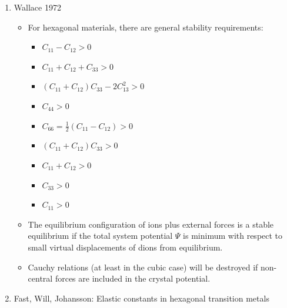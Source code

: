 \documentclass[11pt]{article}
\begin{document}
\begin{enumerate}
\item Wallace 1972
\label{sec:org4622896}
\begin{itemize}
\item For hexagonal materials, there are general stability requirements:
\begin{itemize}
\item \(C_{11} - C_{12} > 0\)
\item \(C_{11} + C_{12} + C_{33} > 0\)
\item \(( C_{11} + C_{12} ) C_{33} - 2C_{13}^{2} > 0\)
\item \(C_{44} > 0\)
\item \(C_{66} = \frac{1}{2}(C_{11} - C_{12}) > 0\)
\item \(( C_{11} + C_{12} )C_{33} > 0\)
\item \(C_{11} + C_{12} > 0\)
\item \(C_{33} > 0\)
\item \(C_{11} > 0\)
\end{itemize}
\item The equilibrium configuration of ions plus external forces is a stable
equilibrium if the total system potential \(\Psi\) is minimum with respect
to small virtual displacements of dions from equilibrium.
\item Cauchy relations (at least in the cubic case) will be destroyed if
non-central forces are included in the crystal potential.
\end{itemize}

\item Fast, Will, Johansson: Elastic constants in hexagonal transition metals
\label{sec:org0fb2d80}


\end{enumerate}
\end{document}
